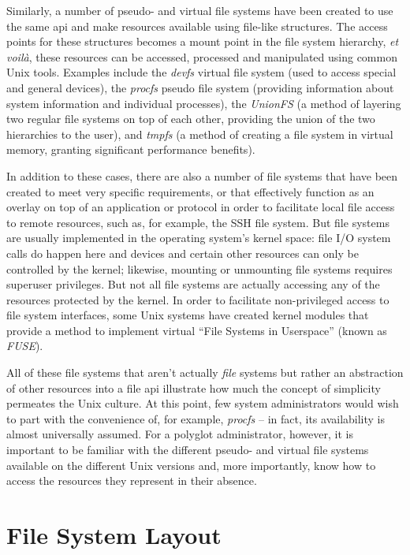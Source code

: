 Similarly, a number of pseudo- and virtual file
systems have been created to use the same \gls{api}
and make resources available using file-like
structures.  The access points for these structures
becomes a mount point in the file system hierarchy,
{\em et voil\`{a}}, these resources can be accessed,
processed and manipulated using common Unix tools.
Examples include the {\em devfs} virtual file system (used to access
special and general devices), the {\em procfs} pseudo
file system (providing information about system
information and individual processes), the {\em
UnionFS} (a method of
layering two regular file systems on top of each
other, providing the union of the two hierarchies to
the user), and {\em tmpfs} (a method of creating a file system
in virtual memory, granting significant performance
benefits).

In addition to these cases, there are also a number of
file systems that have been created to meet very
specific requirements, or that effectively function as
an overlay on top of an application or protocol in
order to facilitate local file access to remote
resources, such as, for example, the SSH file system.
But file systems are usually implemented in the
operating system's kernel space: file I/O system calls
do happen here and devices and certain other resources
can only be controlled by the kernel; likewise,
mounting or unmounting file systems requires superuser
privileges.  But not all file systems are actually
accessing any of the resources protected by the
kernel.  In order to facilitate non-privileged access
to file system interfaces, some Unix systems have
created kernel modules that provide a method to
implement virtual ``File Systems in
Userspace'' (known
as {\em FUSE}).

All of these file systems that aren't actually {\em
file} systems but rather an abstraction of other
resources into a file \gls{api} illustrate how much the
concept of simplicity permeates the Unix culture.  At
this point, few system administrators would wish to
part with the convenience of, for example, {\em
procfs} -- in fact, its availability is almost
universally assumed.  For a polyglot administrator,
however, it is important to be familiar with the
different pseudo- and virtual file systems available
on the different Unix versions and, more importantly,
know how to access the resources they represent in
their absence.

\section{File System Layout}
\label{file systems:layout}

